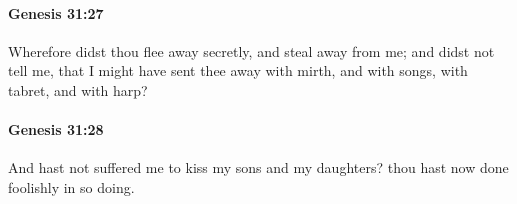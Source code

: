 		\paragraph{Genesis 31:27} %
			\label{GENESIS-31-27}

			Wherefore didst thou flee away secretly, and steal away from me; and didst not tell me, that I might have sent thee away with mirth, and with songs, with tabret, and with harp?


		\paragraph{Genesis 31:28} %
			\label{GENESIS-31-28}

			And hast not suffered me to kiss my sons and my daughters? thou hast now done foolishly in so doing.


